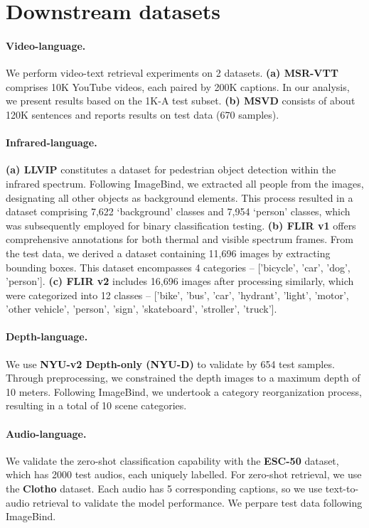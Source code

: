 \documentclass{article} \usepackage{iclr2024_conference,times}
\begin{document}
\section{Downstream datasets}
\label{appendix:downstream_data_details}

\paragraph{Video-language.} We perform video-text retrieval experiments on 2 datasets. \textbf{(a) MSR-VTT} \citep{xu2016msr} comprises 10K YouTube videos, each paired by 200K captions. In our analysis, we present results based on the 1K-A test subset. \textbf{(b) MSVD} \citep{chen2011collecting} consists of about 120K sentences and reports results on test data (670 samples).
\paragraph{Infrared-language.} \textbf{(a) LLVIP} \citep{jia2021llvip} constitutes a dataset for pedestrian object detection within the infrared spectrum. Following ImageBind, we extracted all people from the images, designating all other objects as background elements. This process resulted in a dataset comprising 7,622 `background' classes and 7,954 `person' classes, which was subsequently employed for binary classification testing. \textbf{(b) FLIR v1} \citep{flirv1} offers comprehensive annotations for both thermal and visible spectrum frames. From the test data, we derived a dataset containing 11,696 images by extracting bounding boxes. This dataset encompasses 4 categories -- ['bicycle', 'car', 'dog', 'person']. \textbf{(c) FLIR v2} \citep{flirv2} includes 16,696 images after processing similarly, which were categorized into 12 classes -- ['bike', 'bus', 'car', 'hydrant', 'light', 'motor', 'other vehicle', 'person', 'sign', 'skateboard', 'stroller', 'truck'].
\paragraph{Depth-language.}  We use \textbf{NYU-v2 Depth-only (NYU-D)} \citep{silberman2012indoor} to validate by 654 test samples. Through preprocessing, we constrained the depth images to a maximum depth of 10 meters. Following ImageBind, we undertook a category reorganization process, resulting in a total of 10 scene categories.
\paragraph{Audio-language.} We validate the zero-shot classification capability with the \textbf{ESC-50} \citep{piczak2015esc} dataset, which has 2000 test audios, each uniquely labelled. For zero-shot retrieval, we use the \textbf{Clotho} \citep{font2013freesound} dataset. Each audio has 5 corresponding captions, so we use text-to-audio retrieval to validate the model performance. We perpare test data following ImageBind.
\end{document}
